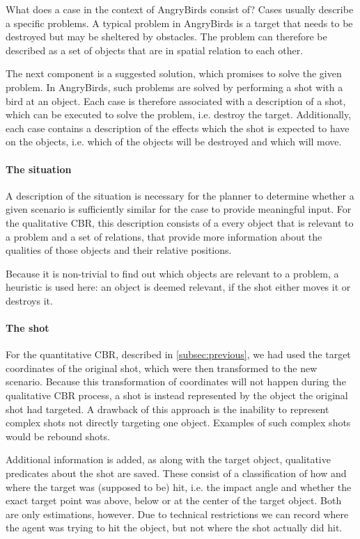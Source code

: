 What does a case in the context of AngryBirds consist of?
Cases usually describe a specific problems.
A typical problem in AngryBirds is a target that needs to be destroyed but may be sheltered by obstacles.
The problem can therefore be described as a set of objects that are in spatial relation to each other.

The next component is a suggested solution, which promises to solve the given problem.
In AngryBirds, such problems are solved by performing a shot with a bird at an object. Each case is therefore associated with a description of a shot, which can be executed to solve the problem, i.e. destroy the target.
Additionally, each case contains a description of the effects which the shot is expected to have on the objects, i.e. which of the objects will be destroyed and which will move.

\paragraph{The situation}
A description of the situation is necessary for the planner to determine whether a given scenario is sufficiently similar for the case to provide meaningful input.
For the qualitative \ac{CBR}, this description consists of a every object that is relevant to a problem and a set of relations, that provide more information about the qualities of those objects and their relative positions.

Because it is non-trivial to find out which objects are relevant to a problem, a heuristic is used here: an object is deemed relevant, if the shot either moves it or destroys it.


\paragraph{The shot}
For the quantitative \ac{CBR}, described in \ref{subsec:previous}, we had used the target coordinates of the original shot, which were then transformed to the new scenario.
Because this transformation of coordinates will not happen during the qualitative CBR process, a shot is instead represented by the object the original shot had targeted.
A drawback of this approach is the inability to represent complex shots not directly targeting one object.
Examples of such complex shots would be rebound shots.

Additional information is added, as along with the target object, qualitative predicates about the shot are saved. 
These consist of a classification of how and where the target was (supposed to be) hit, i.e. the impact angle and whether the exact target point was above, below or at the center of the target object.
Both are only estimations, however. Due to technical restrictions we can record where the agent was trying to hit the object, but not where the shot actually did hit.

